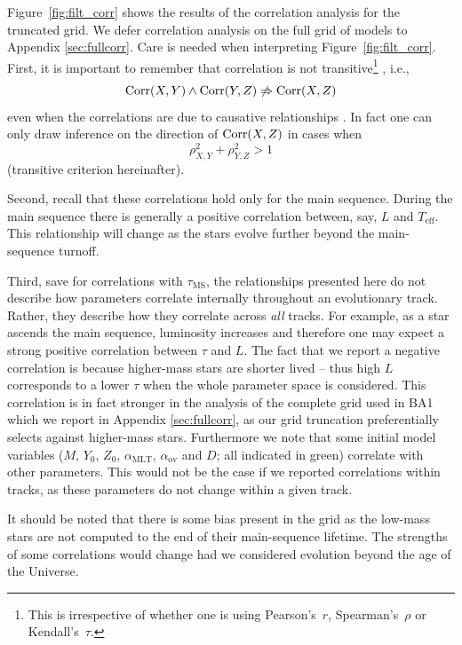 Figure~\ref{fig:filt_corr} shows the results of the correlation analysis for the truncated grid.
We defer correlation analysis on the full grid of models to Appendix \ref{sec:fullcorr}. 
Care is needed when interpreting Figure~\ref{fig:filt_corr}. 
First, it is important to remember that correlation is not transitive\footnote{This is irrespective of whether one is using Pearson's~$r$, Spearman's~$\rho$ or Kendall's~$\tau$.} \citep{lang}, i.e.,
\begin{equation}
\mathrm{Corr}(X,Y) \wedge \mathrm{Corr}(Y,Z) \not \Rightarrow \mathrm{Corr}(X,Z)
\end{equation}
even when the correlations are due to causative relationships \citep{stav}.
In fact one can only draw inference on the direction of ${\mathrm{Corr}(X,Z)}$ in cases when 
\begin{equation}
\rho_{X,Y}^2 + \rho_{Y,Z}^2 > 1
\end{equation}
(transitive criterion hereinafter).

Second, recall that these correlations hold only for the main sequence. During the main sequence there is generally a positive correlation between, say, $L$ and $T_{\text{eff}}$. 
This relationship will change as the stars evolve further beyond the main-sequence turnoff. 

Third, save for correlations with $\tau_{\text{MS}}$, the relationships presented here do not describe how parameters correlate internally throughout an evolutionary track. Rather, they describe how they correlate across \emph{all} tracks. For example, as a star ascends the main sequence, luminosity increases and therefore one may expect a strong positive correlation between $\tau$ and $L$. The fact that we report a negative correlation is because higher-mass stars are shorter lived -- thus high $L$ corresponds to a lower $\tau$  when the whole parameter space is considered. This correlation is in fact stronger in the analysis of the complete grid used in BA1 which we report in Appendix \ref{sec:fullcorr}, as our grid truncation preferentially selects against higher-mass stars. 
Furthermore we note that some initial model variables ($M$, $Y_0$, $Z_0$, $\alpha_{\text{MLT}}$, $\alpha_{\text{ov}}$ and $D$; all indicated in green) correlate with other parameters.  This would not be the case if we reported correlations within tracks, as these parameters do not change within a given track. 

It should be noted that there is some bias present in the grid as the low-mass stars are not computed to the end of their main-sequence lifetime. The strengths of some correlations would change had we considered evolution beyond the age of the Universe. 
